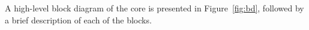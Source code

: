 A high-level block diagram of the core is presented in Figure~\ref{fig:bd}, followed by a brief description of each of the blocks.


\begin{description}
    


\end{description}
